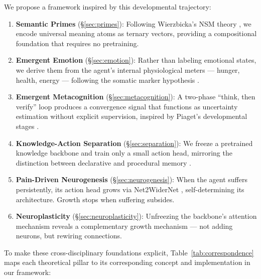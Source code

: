 \documentclass{article}
\begin{document}
We propose a framework inspired by this developmental trajectory:
\begin{enumerate}
    \item \textbf{Semantic Primes} (\S\ref{sec:primes}): Following Wierzbicka's NSM theory \cite{wierzbicka1996semantics}, we encode universal meaning atoms as ternary vectors, providing a compositional foundation that requires no pretraining.
    \item \textbf{Emergent Emotion} (\S\ref{sec:emotion}): Rather than labeling emotional states, we derive them from the agent's internal physiological meters --- hunger, health, energy --- following the somatic marker hypothesis \cite{damasio1994descartes}.
    \item \textbf{Emergent Metacognition} (\S\ref{sec:metacognition}): A two-phase ``think, then verify'' loop produces a convergence signal that functions as uncertainty estimation without explicit supervision, inspired by Piaget's developmental stages \cite{piaget1952origins}.
    \item \textbf{Knowledge-Action Separation} (\S\ref{sec:separation}): We freeze a pretrained knowledge backbone and train only a small action head, mirroring the distinction between declarative and procedural memory \cite{squire1992declarative}.
    \item \textbf{Pain-Driven Neurogenesis} (\S\ref{sec:neurogenesis}): When the agent suffers persistently, its action head grows via Net2WiderNet \cite{chen2015net2net}, self-determining its architecture. Growth stops when suffering subsides.
    \item \textbf{Neuroplasticity} (\S\ref{sec:neuroplasticity}): Unfreezing the backbone's attention mechanism reveals a complementary growth mechanism --- not adding neurons, but rewiring connections.
\end{enumerate}

To make these cross-disciplinary foundations explicit, Table~\ref{tab:correspondence} maps each theoretical pillar to its corresponding concept and implementation in our framework:
\end{document}
